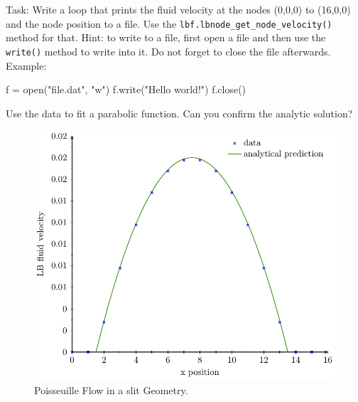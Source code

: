Task: Write a loop that prints the fluid velocity at the nodes (0,0,0) to (16,0,0)
and the node position to a file. Use the \texttt{lbf.lbnode\_get\_node\_velocity()}
method for that. Hint: to write 
to a file, first open a file and then use the \texttt{write()} method to write 
into it. Do not forget to close the file afterwards. Example:
\vspace{ 0,2cm}
\begin{pypresso}[numbers=none]
f = open("file.dat", "w")
f.write("Hello world!\n")
f.close()
\end{pypresso}
\vspace{ 0,2cm}
Use the data to fit a parabolic function. Can you confirm the analytic solution?
\begin{figure}[h]
  \begin{center}
    \includegraphics{figures/poiseuille/poiseuille.pdf}
  \end{center}
  \caption{Poisseuille Flow in a slit Geometry.}
\end{figure}

